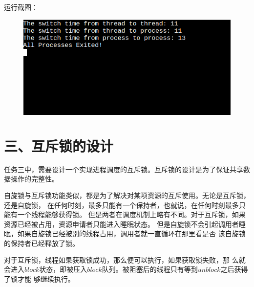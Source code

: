 \documentclass[UTF8,noindent]{ctexart}
\begin{document}
运行截图：
\begin{figure}[H]
	\includegraphics[scale=0.7]{fig/2.png}
\end{figure}

\section*{三、互斥锁的设计}
任务三中，需要设计一个实现进程调度的互斥锁。互斥锁的设计是为了保证共享数据操作的完整性。

自旋锁与互斥锁功能类似，都是为了解决对某项资源的互斥使用。无论是互斥锁，还是自旋锁，
在任何时刻，最多只能有一个保持者，也就说，在任何时刻最多只能有一个线程能够获得锁。
但是两者在调度机制上略有不同。对于互斥锁，如果资源已经被占用，资源申请者只能进入睡眠状态。
但是自旋锁不会引起调用者睡眠，如果自旋锁已经被别的线程占用，调用者就一直循环在那里看是否
该自旋锁的保持者已经释放了锁。

对于互斥锁，线程如果获取锁成功，那么便可以执行，如果获取锁失败，那
么就会进入$block$状态，即被压入$block$队列。被阻塞后的线程只有等到$unblock$之后获得了锁才能
够继续执行。
\end{document}
